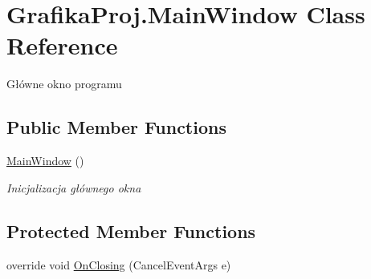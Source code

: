 \hypertarget{class_grafika_proj_1_1_main_window}{}\section{Grafika\+Proj.\+Main\+Window Class Reference}
\label{class_grafika_proj_1_1_main_window}


Główne okno programu  


\subsection*{Public Member Functions}
\begin{DoxyCompactItemize}
\item 
\mbox{\hyperlink{class_grafika_proj_1_1_main_window_a50e09c074337ab658c05dd6f7c0378b1}{Main\+Window}} ()
\begin{DoxyCompactList}\small\item\em Inicjalizacja głównego okna \end{DoxyCompactList}\end{DoxyCompactItemize}
\subsection*{Protected Member Functions}
\begin{DoxyCompactItemize}
\item 
override void \mbox{\hyperlink{class_grafika_proj_1_1_main_window_a1575c0a51eae92482a7d3aa69f88058a}{On\+Closing}} (Cancel\+Event\+Args e)
\end{DoxyCompactItemize}

